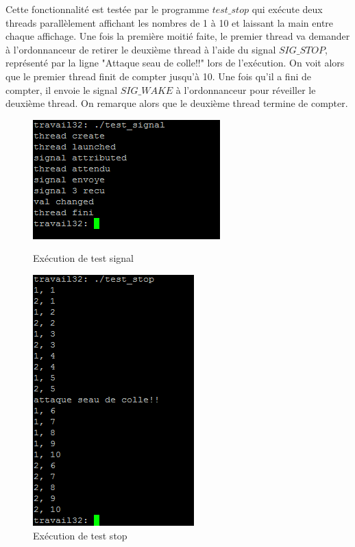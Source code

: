 	Cette fonctionnalité est testée par le programme $test\_stop$
        qui exécute deux threads parallèlement affichant les nombres
        de 1 à 10 et laissant la main entre chaque affichage. Une fois
        la première moitié faite, le premier thread va demander à
        l'ordonnanceur de retirer le deuxième thread à l'aide du
        signal $SIG\_STOP$, représenté par la ligne "Attaque seau de
        colle!!" lors de l'exécution. On voit alors que le premier
        thread finit de compter jusqu'à 10. Une fois qu'il a fini de
        compter, il envoie le signal $SIG\_WAKE$ à l'ordonnanceur pour réveiller le
        deuxième thread. On remarque alors que le deuxième thread
        termine de compter.\\

\begin{figure}[h]
  \begin{minipage}[c]{.45\linewidth}
    \begin{center}
      \includegraphics[]{test_signal.png}
      \caption{Ex\'ecution de test signal}
      \label{test signal}
    \end{center}
  \end{minipage}
  \hfil
  \begin{minipage}[c]{.45\linewidth}
    \begin{center}
      \includegraphics[]{test_stop.png}
      \caption{Ex\'ecution de test stop}
      \label{test stop}
    \end{center}
  \end{minipage}
\end{figure}
